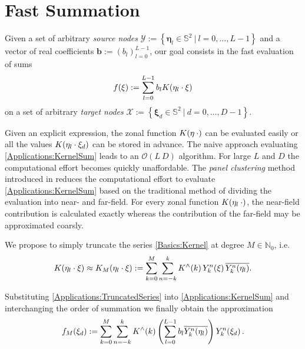 \documentclass[11pt,a4paper,twoside,bibtotoc]{scrartcl}
\theoremstyle{plain}
\theoremstyle{definition}
\theoremstyle{remark}
\newcommand{\NZ}{\ensuremath{\mathbb{N}_{0}}}
\newcommand{\pset}[3]{\ensuremath{\left\{#1\ \left#2\ #3\right.\right\rbrace}}
\newcommand{\twosphere}{\ensuremath{\mathbb{S}^2}}
\newcommand{\fun}[2]{\ensuremath{#1{\hspace{-0.4ex}}\left(#2\right)}}
\newcommand{\paren}[1]{\ensuremath{\left(#1\right)}}
\newcommand{\bigo}[1]{\ensuremath{\mathcal{O}\paren{#1}}}
\newcommand{\mb}[1]{\mathbf{#1}}
\newcommand{\V}[1]{\mb{#1}}
\numberwithin{equation}{section}
\numberwithin{table}{section}
\numberwithin{figure}{section}
\begin{document}
\section{Fast Summation}
Given a set of arbitrary \emph{source nodes} $\mathcal{Y} :=
  \pset{\V{\eta}_{l} \in \twosphere}{|}{l = 0,\ldots,L-1}$ and a vector of
  real coefficients $\V{b}:=(b_{l})_{l=0}^{L-1}$, our goal consists in the fast
evaluation of sums 
\begin{equation}
  \label{Applications:KernelSum}
  \fun{f}{\xi} := \sum_{l = 0}^{L-1} b_{l} \fun{K}{\V{\eta}_{l} \cdot \V{\xi}}
\end{equation}
on a set of arbitrary \emph{target nodes} $\mathcal{X} := \pset{\V{\xi}_{d}
  \in \twosphere}{|}{d=0,\ldots,D-1}$.

Given an explicit expression, the zonal function $\fun{K}{\V{\eta} \: \cdot}$ 
can be evaluated easily or all the values 
$\fun{K}{\V{\eta}_{l} \cdot \V{\xi}_{d}}$ can be stored in
advance. The naive approach evaluating \eqref{Applications:KernelSum} leads to
an $\bigo{L\:D}$ algorithm. 
For large $L$ and $D$ the computational effort becomes quickly unaffordable.
The \emph{panel clustering} method introduced in \cite{FrGlSch98} reduces the
computational effort to evaluate \eqref{Applications:KernelSum} based on the
traditional method of dividing the evaluation into near- and far-field.
For every zonal function $\fun{K}{\V{\eta}_l \: \cdot}$, the near-field contribution
is calculated exactly whereas the contribution of the far-field may be
approximated coarsly.

We propose to simply truncate the series \eqref{Basics:Kernel} at degree 
$M \in \NZ$, i.e.
\begin{equation}
  \label{Applications:TruncatedSeries}
  \fun{K}{\V{\eta}_{l} \cdot \V{\xi}} \approx \fun{K_{M}}{\V{\eta}_{l} \cdot
  \V{\xi}} := \sum_{k=0}^{M} \sum_{n=-k}^k \fun{K^{\wedge}}{k}
  \fun{Y_{k}^n}{\V{\xi}} \overline{\fun{Y_{k}^n}{\V{\eta}_{l}}}.
\end{equation}

Substituting \eqref{Applications:TruncatedSeries} into
\eqref{Applications:KernelSum} and interchanging the order of summation we
finally obtain the approximation
\[
  \fun{f_{M}}{\xi_{d}} := \sum_{k=0}^{M} \sum_{n=-k}^k \fun{K^{\wedge}}{k}
  \paren{\sum_{l = 0}^{L-1} b_{l} \overline{\fun{Y_{k}^n}{\V{\eta}_{l}}}}
  \fun{Y_{k}^n}{\V{\xi}_{d}}.
\]
\end{document}
